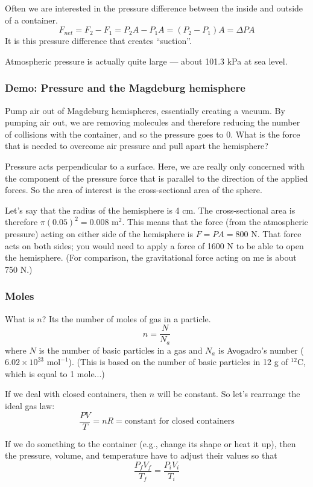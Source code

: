Often we are interested in the pressure difference between the inside and outside of a container. 
$$F_{net}=F_2-F_1=P_2A-P_1A=(P_2-P_1)A=\Delta{P}A$$
It is this pressure difference that creates ``suction''.

Atmospheric pressure is actually quite large --- about 101.3 kPa at sea level. 

\subsubsection{Demo: Pressure and the Magdeburg hemisphere}
Pump air out of Magdeburg hemispheres, essentially creating a vacuum. By pumping air out, we are removing molecules and therefore reducing the number of collisions with the container, and so the pressure goes to 0. What is the force that is needed to overcome air pressure and pull apart the hemisphere?

Pressure acts perpendicular to a surface. Here, we are really only concerned with the component of the pressure force that is parallel to the direction of the applied forces. So the area of interest is the cross-sectional area of the sphere.

Let's say that the radius of the hemisphere is 4 cm. The cross-sectional area is therefore $\pi(0.05)^2=0.008\mbox{ m}^2$. This means that the force (from the atmospheric pressure) acting on either side of the hemisphere is $F=PA=800\mbox{ N}$. That force acts on both sides; you would need to apply a force of 1600 N to be able to open the hemisphere. (For comparison, the gravitational force acting on me is about 750 N.)

\subsubsection{Moles}
What is $n$? Its the number of moles of gas in a particle.
$$n=\frac{N}{N_a}$$
where $N$ is the number of basic particles in a gas and $N_a$ is Avogadro's number ($6.02\times 10^{23}\mbox{ mol}^{-1}$). (This is based on the number of basic particles in 12 g of $^{12}$C, which is equal to 1 mole...)

If we deal with closed containers, then $n$ will be constant. So let's rearrange the ideal gas law:
$$\frac{PV}{T}=nR=\mbox{constant for closed containers}$$

If we do something to the container (e.g., change its shape or heat it up), then the pressure, volume, and temperature have to adjust their values so that
$$\frac{P_fV_f}{T_f}=\frac{P_iV_i}{T_i}$$


